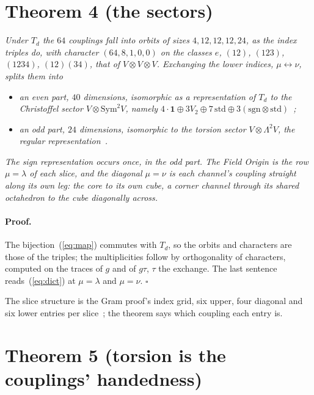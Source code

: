 \documentclass[twocolumn]{iopjournal}
\begin{document}

\section*{Theorem 4 (the sectors)}

\emph{Under $T_d$ the $64$ couplings fall into orbits of sizes
$4, 12, 12, 12, 24$, as the index triples do, with character
$(64, 8, 1, 0, 0)$ on the classes $e$, $(12)$, $(123)$, $(1234)$,
$(12)(34)$, that of $V \otimes V \otimes V$. Exchanging the lower
indices, $\mu \leftrightarrow \nu$, splits them into}
\begin{itemize}
\item \emph{an even part, $40$ dimensions, isomorphic as a
  representation of $T_d$ to the Christoffel sector
  $V \otimes \mathrm{Sym}^2V$, namely
  $4\cdot\mathbf 1 \oplus 3V_2 \oplus 7\,\mathrm{std} \oplus
  3(\mathrm{sgn}\otimes\mathrm{std})$~\cite{NelsonB};}
\item \emph{an odd part, $24$ dimensions, isomorphic to the torsion
  sector $V \otimes \Lambda^2V$, the regular
  representation~\cite{NelsonTorsion}.}
\end{itemize}
\emph{The sign representation occurs once, in the odd part. The
Field Origin is the row $\mu = \lambda$ of each slice, and the
diagonal $\mu = \nu$ is each channel's coupling straight along its
own leg: the core to its own cube, a corner channel through its
shared octahedron to the cube diagonally across.}

\paragraph{Proof.} The bijection~(\ref{eq:map}) commutes with $T_d$,
so the orbits and characters are those of the triples; the
multiplicities follow by orthogonality of characters, computed on
the traces of $g$ and of $g\tau$, $\tau$ the exchange. The last
sentence reads~(\ref{eq:dict}) at $\mu = \lambda$ and $\mu = \nu$.
\hfill $\square$

\medskip\noindent
The slice structure is the Gram proof's index grid, six upper, four
diagonal and six lower entries per slice~\cite{NelsonGram}; the
theorem says which coupling each entry is.


\section*{Theorem 5 (torsion is the couplings' handedness)}
\end{document}
